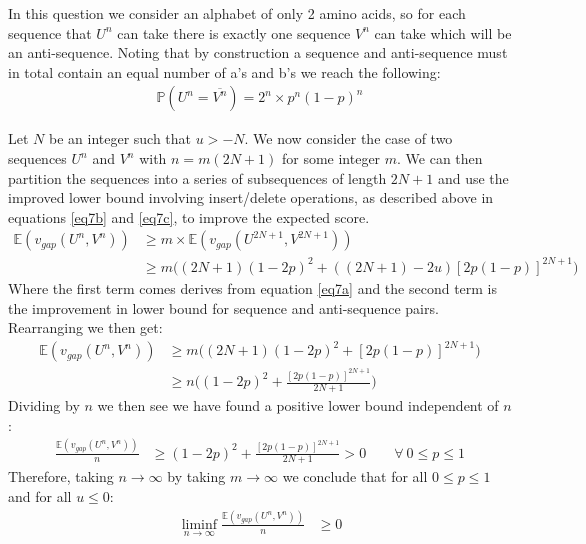 \documentclass[a4paper]{article}
\begin{document}
\bigskip
In this question we consider an alphabet of only 2 amino acids, so for each sequence that $U^n$ can take there is exactly one sequence $V^n$ can take which will be an anti-sequence. Noting that by construction a sequence and anti-sequence must in total contain an equal number of a's and b's we reach the following:
\begin{align*}
    \mathbb{P}(U^n = \overline{V^n}) = 2^n \times p^n (1-p)^n
\end{align*}

Let $N$ be an integer such that $u>-N$. We now consider the case of two sequences $U^n$ and $V^n$ with $n=m(2N+1)$ for some integer $m$. We can then partition the sequences into a series of subsequences of length $2N+1$ and use the improved lower bound involving insert/delete operations, as described above in equations \ref{eq7b} and \ref{eq7c}, to improve the expected score.
\begin{align*}
     \mathbb{E}(v_{gap}(U^n, V^n)) &\geq m \times \mathbb{E}(v_{gap}(U^{2N+1}, V^{2N+1})) \\
                                   &\geq m \bigg( (2N+1)(1-2p)^2 + ((2N+1) - 2u)[2p(1-p)]^{2N+1} \bigg)
\end{align*}
Where the first term comes derives from equation \ref{eq7a} and the second term is the improvement in lower bound for sequence and anti-sequence pairs. Rearranging we then get:
\begin{align*}
     \mathbb{E}(v_{gap}(U^n, V^n)) &\geq m \bigg( (2N+1)(1-2p)^2 + [2p(1-p)]^{2N+1} \bigg) \\
                                   &\geq n \bigg( (1-2p)^2 + \frac{[2p(1-p)]^{2N+1}}{2N+1} \bigg)
\end{align*}
Dividing by $n$ we then see we have found a positive lower bound independent of $n$:
\begin{align*}
     \frac{\mathbb{E}(v_{gap}(U^n, V^n))}{n} &\geq (1-2p)^2 + \frac{[2p(1-p)]^{2N+1}}{2N+1} > 0 \qquad \forall\ 0\leq p \leq 1
\end{align*}
Therefore, taking $n\rightarrow\infty$ by taking $m\rightarrow\infty$ we conclude that for all $0\leq p \leq 1$ and for all $u\leq0$:
\begin{align*}
    \liminf_{n\rightarrow\infty} \frac{\mathbb{E}(v_{gap}(U^n,V^n))}{n} &\geq 0
\end{align*}
\end{document}

